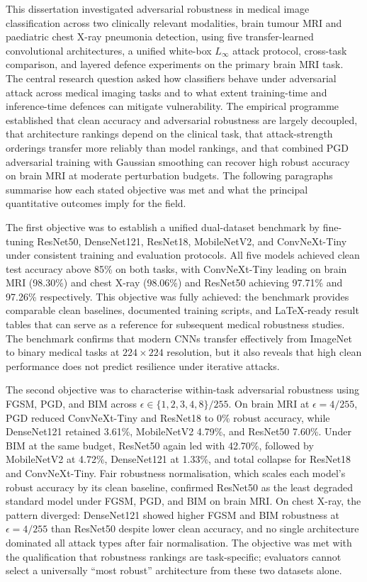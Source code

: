 \documentclass[12pt,a4paper,oneside]{report}
\begin{document}
This dissertation investigated adversarial robustness in medical image classification across two clinically relevant modalities, brain tumour MRI and paediatric chest X-ray pneumonia detection, using five transfer-learned convolutional architectures, a unified white-box $L_\infty$ attack protocol, cross-task comparison, and layered defence experiments on the primary brain MRI task. The central research question asked how classifiers behave under adversarial attack across medical imaging tasks and to what extent training-time and inference-time defences can mitigate vulnerability. The empirical programme established that clean accuracy and adversarial robustness are largely decoupled, that architecture rankings depend on the clinical task, that attack-strength orderings transfer more reliably than model rankings, and that combined PGD adversarial training with Gaussian smoothing can recover high robust accuracy on brain MRI at moderate perturbation budgets. The following paragraphs summarise how each stated objective was met and what the principal quantitative outcomes imply for the field.

The first objective was to establish a unified dual-dataset benchmark by fine-tuning ResNet50, DenseNet121, ResNet18, MobileNetV2, and ConvNeXt-Tiny under consistent training and evaluation protocols. All five models achieved clean test accuracy above 85\% on both tasks, with ConvNeXt-Tiny leading on brain MRI (98.30\%) and chest X-ray (98.06\%) and ResNet50 achieving 97.71\% and 97.26\% respectively. This objective was fully achieved: the benchmark provides comparable clean baselines, documented training scripts, and LaTeX-ready result tables that can serve as a reference for subsequent medical robustness studies. The benchmark confirms that modern CNNs transfer effectively from ImageNet to binary medical tasks at $224 \times 224$ resolution, but it also reveals that high clean performance does not predict resilience under iterative attacks.

The second objective was to characterise within-task adversarial robustness using FGSM, PGD, and BIM across $\epsilon \in \{1,2,3,4,8\}/255$. On brain MRI at $\epsilon = 4/255$, PGD reduced ConvNeXt-Tiny and ResNet18 to 0\% robust accuracy, while DenseNet121 retained 3.61\%, MobileNetV2 4.79\%, and ResNet50 7.60\%. Under BIM at the same budget, ResNet50 again led with 42.70\%, followed by MobileNetV2 at 4.72\%, DenseNet121 at 1.33\%, and total collapse for ResNet18 and ConvNeXt-Tiny. Fair robustness normalisation, which scales each model's robust accuracy by its clean baseline, confirmed ResNet50 as the least degraded standard model under FGSM, PGD, and BIM on brain MRI. On chest X-ray, the pattern diverged: DenseNet121 showed higher FGSM and BIM robustness at $\epsilon = 4/255$ than ResNet50 despite lower clean accuracy, and no single architecture dominated all attack types after fair normalisation. The objective was met with the qualification that robustness rankings are task-specific; evaluators cannot select a universally ``most robust'' architecture from these two datasets alone.
\end{document}
